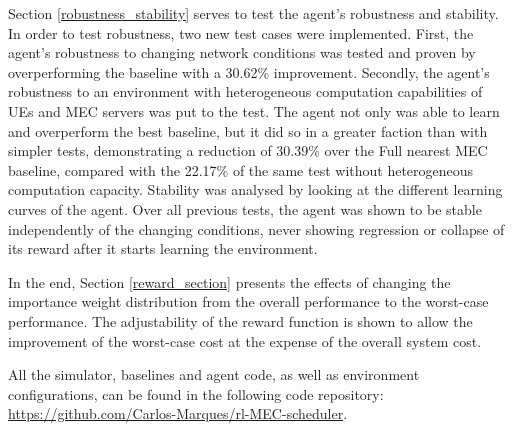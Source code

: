 Section \ref{robustness_stability} serves to test the agent's robustness and stability. In order to test robustness, two new test cases were implemented. First, the agent's robustness to changing network conditions was tested and proven by overperforming the baseline with a 30.62\% improvement. Secondly, the agent's robustness to an environment with heterogeneous computation capabilities of \acrshort{UE}s and \acrshort{MEC} servers was put to the test. The agent not only was able to learn and overperform the best baseline, but it did so in a greater faction than with simpler tests, demonstrating a reduction of 30.39\% over the Full nearest MEC baseline, compared with the 22.17\% of the same test without heterogeneous computation capacity. Stability was analysed by looking at the different learning curves of the agent. Over all previous tests, the agent was shown to be stable independently of the changing conditions, never showing regression or collapse of its reward after it starts learning the environment.

In the end, Section \ref{reward_section} presents the effects of changing the importance weight distribution from the overall performance to the worst-case performance. The adjustability of the reward function is shown to allow the improvement of the worst-case cost at the expense of the overall system cost.

All the simulator, baselines and agent code, as well as environment configurations, can be found in the following code repository:
\href{https://github.com/Carlos-Marques/rl-MEC-scheduler}{https://github.com/Carlos-Marques/rl-MEC-scheduler}.


